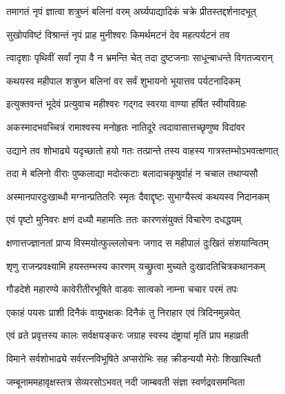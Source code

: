 \twolineshloka
{तमागतं नृपं ज्ञात्वा शत्रुघ्नं बलिनां वरम्}
{अर्घ्यपाद्यादिकं चक्रे प्रीतस्तद्दर्शनादभूत्}%

\twolineshloka
{सुखोपविष्टं विश्रान्तं नृपं प्राह मुनीश्वरः}
{किमर्थमटनं देव महत्पर्यटनं तव}%

\twolineshloka
{त्वादृशाः पृथिवीं सर्वां नृपा वै न भ्रमन्ति चेत्}
{तदा दुष्टजनाः साधून्बाधन्ते विगतज्वरान्}%

\twolineshloka
{कथयस्व महीपाल शत्रुघ्न बलिनां वर}
{सर्वं शुभायनो भूयात्तव पर्यटनादिकम्}%


\twolineshloka
{इत्युक्तवन्तं भूदेवं प्रत्युवाच महीश्वरः}
{गद्गद स्वरया वाण्या हर्षित स्वीयविग्रहः}%


\twolineshloka
{अकस्मादभवच्चित्रं रामाश्वस्य मनोहृतः}
{नातिदूरे त्वदावासात्तच्छृणुष्व विदांवर}%

\twolineshloka
{उद्याने तव शोभाढ्ये यदृच्छातो हयो गतः}
{तत्प्रान्ते तस्य वाहस्य गात्रस्तम्भोऽभवत्क्षणात्}%

\twolineshloka
{तदा मे बलिनो वीराः पुष्कलाद्या मदोत्कटाः}
{बलादाचकृषुर्वाहं न चचाल तथाप्यसौ}%

\twolineshloka
{अस्मानपारदुःखाब्धौ मग्नान्प्रतितरिः स्मृतः}
{दैवाद्दृष्टः सुभाग्यैस्त्वं कथयस्व निदानकम्}%


\twolineshloka
{एवं पृष्टो मुनिवरः क्षणं दध्यौ महामतिः}
{ततः कारणसंयुक्तं विचारेण दधद्धयम्}%

\twolineshloka
{क्षणात्तज्ज्ञानतां प्राप्य विस्मयोत्फुल्ललोचनः}
{जगाद स महीपालं दुःखितं संशयान्वितम्}%


\twolineshloka
{शृणु राजन्प्रवक्ष्यामि हयस्तम्भस्य कारणम्}
{यच्छ्रुत्वा मुच्यते दुःखादतिचित्रकथानकम्}%

\twolineshloka
{गौडदेशे महारण्ये कावेरीतीरभूषिते}
{वाडवः सात्वको नाम्ना चचार परमं तपः}%

\twolineshloka
{एकाहं पयसः प्राशी दिनैकं वायुभक्षकः}
{दिनैकं तु निराहार एवं त्रिदिनमुन्नयेत्}%

\twolineshloka
{एवं व्रते प्रवृत्तस्य कालः सर्वक्षयङ्करः}
{जग्राह स्वस्य दंष्ट्रायां मृतिं प्राप महाव्रती}%

\twolineshloka
{विमाने सर्वशोभाढ्ये सर्वरत्नविभूषिते}
{अप्सरोभिः सह क्रीडन्ययौ मेरोः शिखास्थितौ}%

\twolineshloka
{जम्बूनाममहावृक्षस्तत्र सेव्यरसोऽभवत्}
{नदी जाम्बवती संज्ञा स्वर्णद्रवसमन्विता}%


